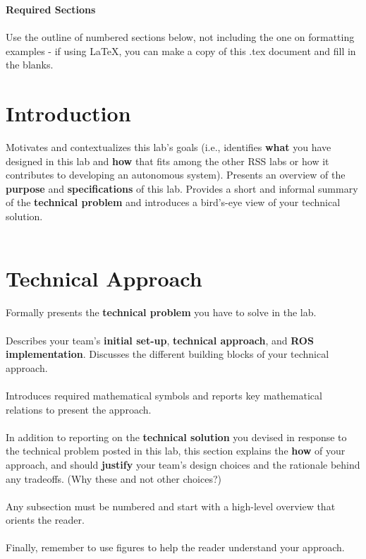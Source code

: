 \documentclass{article}
\begin{document}
\textbf{Required Sections}\\\\
Use the outline of numbered sections below, not including the one on formatting examples - if using LaTeX, you can make a copy of this .tex document and fill in the blanks.

\section{Introduction}
Motivates and contextualizes this lab’s goals (i.e., identifies \textbf{what} you have designed in this lab and \textbf{how} that fits among the other RSS labs or how it contributes to developing an autonomous system). Presents an overview of the \textbf{purpose} and \textbf{specifications} of this lab. Provides a short and informal summary of the \textbf{technical problem} and introduces a bird’s-eye view of your technical solution.\\\\

\section{Technical Approach}
Formally presents the \textbf{technical problem} you have to solve in the lab.\\\\
Describes your team’s \textbf{initial set-up}, \textbf{technical approach}, and \textbf{ROS implementation}. Discusses the different building blocks of your technical approach.\\\\
Introduces required mathematical symbols and reports key mathematical relations to present the approach.\\\\
In addition to reporting on the \textbf{technical solution} you devised in response to the technical problem posted in this lab, this section explains the \textbf{how} of your approach, and should \textbf{justify} your team’s design choices and the rationale behind any tradeoffs. (Why these and not other choices?)\\\\
Any subsection must be numbered and start with a high-level overview that orients the reader.\\\\
Finally, remember to use figures to help the reader understand your approach.\\\\
\end{document}
